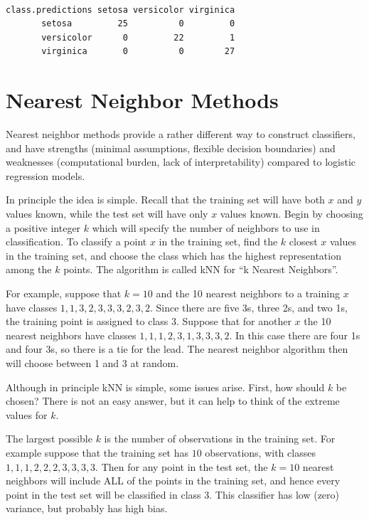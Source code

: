 \documentclass[]{krantz}
\begin{document}
\begin{verbatim}
                 
class.predictions setosa versicolor virginica
       setosa         25          0         0
       versicolor      0         22         1
       virginica       0          0        27
\end{verbatim}

\section{Nearest Neighbor Methods}\label{nearest-neighbor-methods}

Nearest neighbor methods provide a rather different way to construct
classifiers, and have strengths (minimal assumptions, flexible decision
boundaries) and weaknesses (computational burden, lack of
interpretability) compared to logistic regression models.

In principle the idea is simple. Recall that the training set will have
both \(x\) and \(y\) values known, while the test set will have only
\(x\) values known. Begin by choosing a positive integer \(k\) which
will specify the number of neighbors to use in classification. To
classify a point \(x\) in the training set, find the \(k\) closest \(x\)
values in the training set, and choose the class which has the highest
representation among the \(k\) points. The algorithm is called kNN for
``k Nearest Neighbors''.

For example, suppose that \(k=10\) and the 10 nearest neighbors to a
training \(x\) have classes \(1, 1, 3, 2, 3, 3, 3, 2, 3, 2\). Since
there are five 3s, three 2s, and two 1s, the training point is assigned
to class 3. Suppose that for another \(x\) the 10 nearest neighbors have
classes \(1,1,1,2,3,1,3,3,3,2\). In this case there are four 1s and four
3s, so there is a tie for the lead. The nearest neighbor algorithm then
will choose between 1 and 3 at random.

Although in principle kNN is simple, some issues arise. First, how
should \(k\) be chosen? There is not an easy answer, but it can help to
think of the extreme values for \(k\).

The largest possible \(k\) is the number of observations in the training
set. For example suppose that the training set has \(10\) observations,
with classes \(1, 1, 1, 2, 2, 2, 3, 3, 3, 3\). Then for any point in the
test set, the \(k=10\) nearest neighbors will include ALL of the points
in the training set, and hence every point in the test set will be
classified in class 3. This classifier has low (zero) variance, but
probably has high bias.
\end{document}
